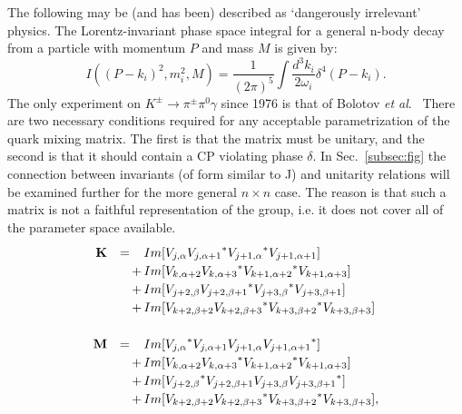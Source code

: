 \documentclass{blois}
\def\ra{\rightarrow}
\begin{document}
The following may be (and has been) described as `dangerously irrelevant'
physics. The Lorentz-invariant phase space integral for
a general n-body decay from a particle with momentum $P$
and mass $M$ is given by:
\begin{equation}
I((P - k_i)^2, m^2_i, M) = \frac{1}{(2 \pi)^5}\!
\int\!\frac{d^3 k_i}{2 \omega_i} \! \delta^4(P - k_i).
\label{eq:murnf}
\end{equation}
The only experiment on $K^{\pm} \ra \pi^{\pm} \pi^0 \gamma$ since 1976
is that of Bolotov {\it et al}.~\cite{bu}
        There are two
necessary conditions required for any acceptable
parametrization of the
quark mixing matrix. The first is that the matrix must be unitary, and the
second is that it should contain a CP violating phase $\delta$.
 In Sec.~\ref{subsec:fig} the connection between invariants (of
form similar to J) and unitarity relations
will be examined further for the more general $ n \times n $ case.
The reason is that such a matrix is not a faithful representation of the group,
i.e. it does not cover all of the parameter space available.
\begin{equation}
\renewcommand{\arraystretch}{1.2}
\begin{array}{rc@{\,}c@{\,}l}

\bf{K} & = &&  Im[V_{j, \alpha} {V_{j,\alpha + 1}}^*
{V_{j + 1,\alpha }}^* V_{j + 1, \alpha + 1} ] \\
       &   & + & Im[V_{k, \alpha + 2} {V_{k,\alpha + 3}}^*
{V_{k + 1,\alpha + 2 }}^* V_{k + 1, \alpha + 3} ]  \\
       &   & + & Im[V_{j + 2, \beta} {V_{j + 2,\beta + 1}}^*
{V_{j + 3,\beta }}^* V_{j + 3, \beta + 1} ]  \\
       &   & + & Im[V_{k + 2, \beta + 2} {V_{k + 2,\beta + 3}}^*
{V_{k + 3,\beta + 2 }}^* V_{k + 3, \beta + 3}] \\
& & \\
\bf{M} & = &&  Im[{V_{j, \alpha}}^* V_{j,\alpha + 1}
V_{j + 1,\alpha } {V_{j + 1, \alpha + 1}}^* ]  \\
       &   & + & Im[V_{k, \alpha + 2} {V_{k,\alpha + 3}}^*
{V_{k + 1,\alpha + 2 }}^* V_{k + 1, \alpha + 3} ]  \\
       &   & + & Im[{V_{j + 2, \beta}}^* V_{j + 2,\beta + 1}
V_{j + 3,\beta } {V_{j + 3, \beta + 1}}^* ]  \\
       &   & + & Im[V_{k + 2, \beta + 2} {V_{k + 2,\beta + 3}}^*
{V_{k + 3,\beta + 2 }}^* V_{k + 3, \beta + 3}],
\\ & &
\end{array}
\label{eq:spa}
\end{equation}
\end{document}
